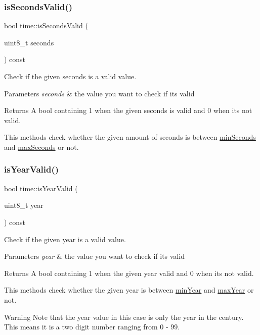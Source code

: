 \subsubsection{\texorpdfstring{is\+Seconds\+Valid()}{isSecondsValid()}}
{\footnotesize\ttfamily bool time\+::is\+Seconds\+Valid (\begin{DoxyParamCaption}\item[{uint8\+\_\+t}]{seconds }\end{DoxyParamCaption}) const}



Check if the given seconds is a valid value. 


\begin{DoxyParams}{Parameters}
{\em seconds} & the value you want to check if it\textquotesingle{}s valid \\
\hline
\end{DoxyParams}
\begin{DoxyReturn}{Returns}
A bool containing 1 when the given seconds is valid and 0 when it\textquotesingle{}s not valid.
\end{DoxyReturn}
This methods check whether the given amount of seconds is between \mbox{\hyperlink{}{min\+Seconds}} and \mbox{\hyperlink{}{max\+Seconds}} or not. \mbox{\label{classtime_ad6269d0f650cfc32e0ac83b09816abad}} 
\subsubsection{\texorpdfstring{is\+Year\+Valid()}{isYearValid()}}
{\footnotesize\ttfamily bool time\+::is\+Year\+Valid (\begin{DoxyParamCaption}\item[{uint8\+\_\+t}]{year }\end{DoxyParamCaption}) const}



Check if the given year is a valid value. 


\begin{DoxyParams}{Parameters}
{\em year} & the value you want to check if it\textquotesingle{}s valid \\
\hline
\end{DoxyParams}
\begin{DoxyReturn}{Returns}
A bool containing 1 when the given year valid and 0 when it\textquotesingle{}s not valid.
\end{DoxyReturn}
This methods check whether the given year is between \mbox{\hyperlink{}{min\+Year}} and \mbox{\hyperlink{}{max\+Year}} or not. \begin{DoxyWarning}{Warning}
Note that the year value in this case is only the year in the century. This means it is a two digit number ranging from 0 -\/ 99. 
\end{DoxyWarning}


